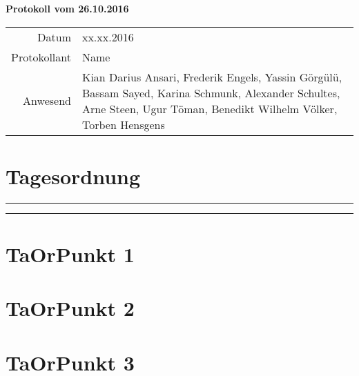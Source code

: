 \documentclass{scrartcl}
\begin{document}
\begin{flushleft}
{\LARGE \textbf{Protokoll vom 26.10.2016}}
\end{flushleft}
 
\begin{tabular}{rp{11.3cm}} \toprule
Datum & xx.xx.2016 \\
Protokollant &  Name \\
Anwesend & Kian Darius Ansari, Frederik Engels, Yassin G\"org\"ul\"u, Bassam Sayed, Karina Schmunk, Alexander Schultes, Arne Steen, Ugur T\"oman,  Benedikt Wilhelm V\"olker, Torben Hensgens\\ \bottomrule
\end{tabular}
 
\section*{Tagesordnung}
 
\vspace*{1em}\hrule
\renewcommand{\contentsname}{}
\tableofcontents
 
\vspace*{1em}\hrule
 
\section{TaOrPunkt 1}
 
\begin{compactitem}
\item 
\item 
\end{compactitem}
 
\section{TaOrPunkt 2}
 
\begin{compactitem}
\item 
\item 
\end{compactitem}
 
\section{TaOrPunkt 3}
 
\begin{compactitem}
\item 
\item 
\end{compactitem}
\end{document}
